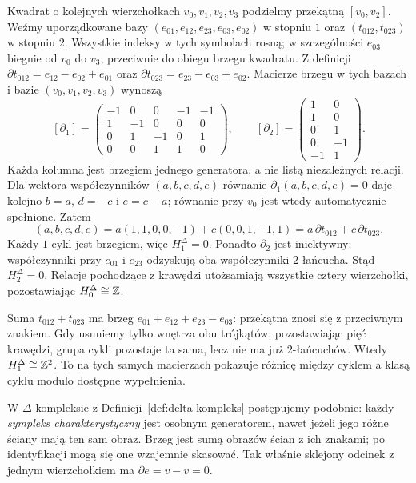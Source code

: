 \begin{przyklad}
\label{prz:homologia-kwadrat}
Kwadrat o kolejnych wierzchołkach $v_0,v_1,v_2,v_3$
podzielmy przekątną $[v_0,v_2]$.
Weźmy uporządkowane bazy
$(e_{01},e_{12},e_{23},e_{03},e_{02})$ w stopniu $1$
oraz $(t_{012},t_{023})$ w stopniu $2$.
Wszystkie indeksy w tych symbolach rosną; w szczególności
$e_{03}$ biegnie od $v_0$ do $v_3$, przeciwnie do obiegu brzegu
kwadratu. Z definicji
$\partial t_{012}=e_{12}-e_{02}+e_{01}$ oraz
$\partial t_{023}=e_{23}-e_{03}+e_{02}$.
Macierze brzegu w tych bazach i bazie $(v_0,v_1,v_2,v_3)$ wynoszą
\[
 [\partial_1]=
 \begin{pmatrix}
 -1&0&0&-1&-1\\
 1&-1&0&0&0\\
 0&1&-1&0&1\\
 0&0&1&1&0
 \end{pmatrix},\qquad
 [\partial_2]=
 \begin{pmatrix}1&0\\1&0\\0&1\\0&-1\\-1&1\end{pmatrix}.
\]
Każda kolumna jest brzegiem jednego generatora, a nie listą
niezależnych relacji. Dla wektora współczynników $(a,b,c,d,e)$
równanie $\partial_1(a,b,c,d,e)=0$ daje kolejno
$b=a$, $d=-c$ i $e=c-a$; równanie przy $v_0$ jest wtedy
automatycznie spełnione. Zatem
\[
 (a,b,c,d,e)
 =a(1,1,0,0,-1)+c(0,0,1,-1,1)
 =a\,\partial t_{012}+c\,\partial t_{023}.
\]
Każdy $1$-cykl jest brzegiem, więc $H_1^\Delta=0$.
Ponadto $\partial_2$ jest iniektywny: współczynniki przy
$e_{01}$ i $e_{23}$ odzyskują oba współczynniki $2$-łańcucha.
Stąd $H_2^\Delta=0$. Relacje pochodzące z krawędzi utożsamiają
wszystkie cztery wierzchołki, pozostawiając $H_0^\Delta\cong\mathbb{Z}$.

Suma $t_{012}+t_{023}$ ma brzeg
$e_{01}+e_{12}+e_{23}-e_{03}$: przekątna znosi się z przeciwnym
znakiem. Gdy usuniemy tylko wnętrza obu trójkątów, pozostawiając
pięć krawędzi, grupa cykli pozostaje ta sama, lecz nie ma już
$2$-łańcuchów. Wtedy $H_1^\Delta\cong\mathbb{Z}^2$.
To na tych samych macierzach pokazuje różnicę między cyklem
a klasą cyklu modulo dostępne wypełnienia.
\end{przyklad}

W $\Delta$-kompleksie z
Definicji~\ref{def:delta-kompleks} postępujemy
podobnie: każdy \emph{sympleks charakterystyczny}
jest osobnym generatorem, nawet jeżeli jego
różne ściany mają ten sam obraz. Brzeg
jest sumą obrazów ścian z ich znakami;
po identyfikacji mogą się one wzajemnie
skasować. Tak właśnie sklejony odcinek
z jednym wierzchołkiem ma $\partial e=v-v=0$.

